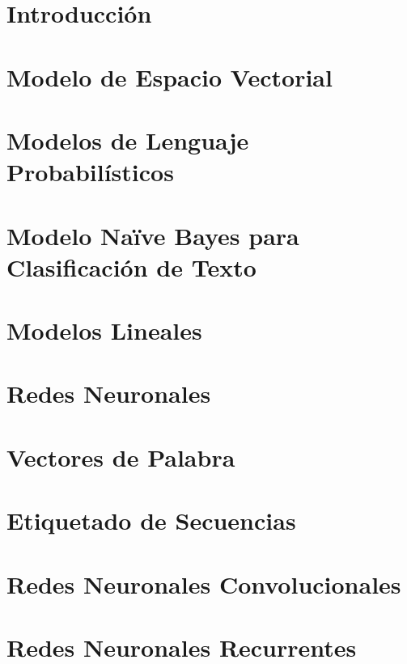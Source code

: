 \documentclass[11pt,fleqn]{book} %
\begin{document}
\chapter{Introducción}
\label{cap_intro}




\chapter{Modelo de Espacio Vectorial}
\label{cap_ir}



\chapter{Modelos de Lenguaje Probabilísticos}
\label{cap_plm}



\chapter{Modelo Naïve Bayes para Clasificación de Texto}
\label{cap_nb}



\chapter{Modelos Lineales}
\label{cap_lineales}



\chapter{Redes Neuronales}
\label{cap_redes}


\chapter{Vectores de Palabra}
\label{cap_embeddings}


\chapter{Etiquetado de Secuencias}
\label{cap_etisec}




\chapter{Redes Neuronales Convolucionales}
\label{cap_cnn}



\chapter{Redes Neuronales Recurrentes}
\label{cap_rnn}

\end{document}
